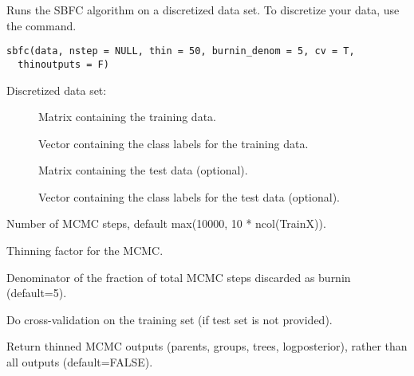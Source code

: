 \documentclass[a4paper]{book}
\begin{document}
%
\begin{References}\relax
{}
\end{References}
%
\begin{Description}\relax
Runs the SBFC algorithm on a discretized data set. To discretize your data, use the  command.
\end{Description}
%
\begin{Usage}
\begin{verbatim}
sbfc(data, nstep = NULL, thin = 50, burnin_denom = 5, cv = T,
  thinoutputs = F)
\end{verbatim}
\end{Usage}
%
\begin{Arguments}
\begin{ldescription}
\item[\code{data}] Discretized data set:
\begin{description}
     
\item[] Matrix containing the training data.
\item[] Vector containing the class labels for the training data.
\item[] Matrix containing the test data (optional).
\item[] Vector containing the class labels for the test data (optional).

\end{description}


\item[\code{nstep}] Number of MCMC steps, default max(10000, 10 * ncol(TrainX)).

\item[\code{thin}] Thinning factor for the MCMC.

\item[\code{burnin\_denom}] Denominator of the fraction of total MCMC steps discarded as burnin (default=5).

\item[\code{cv}] Do cross-validation on the training set (if test set is not provided).

\item[\code{thinoutputs}] Return thinned MCMC outputs (parents, groups, trees, logposterior), rather than all outputs (default=FALSE).
\end{ldescription}
\end{Arguments}
\end{document}
